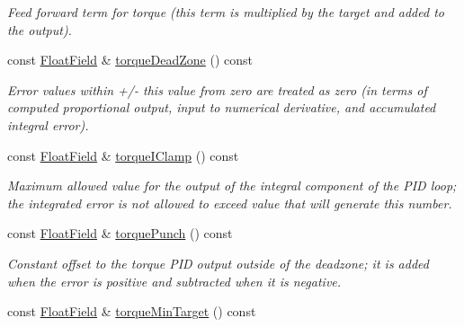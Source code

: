 \begin{DoxyCompactItemize}
\begin{DoxyCompactList}\small\item\em Feed forward term for torque (this term is multiplied by the target and added to the output). \end{DoxyCompactList}\item 
const \hyperlink{classhebi_1_1Info_1_1FloatField}{Float\+Field} \& \hyperlink{classhebi_1_1Info_1_1Settings_1_1Actuator_1_1TorqueGains_a2626b79437a08ccd5c1c5ac2aa8c3142}{torque\+Dead\+Zone} () const \hypertarget{classhebi_1_1Info_1_1Settings_1_1Actuator_1_1TorqueGains_a2626b79437a08ccd5c1c5ac2aa8c3142}{}\label{classhebi_1_1Info_1_1Settings_1_1Actuator_1_1TorqueGains_a2626b79437a08ccd5c1c5ac2aa8c3142}

\begin{DoxyCompactList}\small\item\em Error values within +/-\/ this value from zero are treated as zero (in terms of computed proportional output, input to numerical derivative, and accumulated integral error). \end{DoxyCompactList}\item 
const \hyperlink{classhebi_1_1Info_1_1FloatField}{Float\+Field} \& \hyperlink{classhebi_1_1Info_1_1Settings_1_1Actuator_1_1TorqueGains_ad7891144d29f8f64be2e34aa76c775b6}{torque\+I\+Clamp} () const \hypertarget{classhebi_1_1Info_1_1Settings_1_1Actuator_1_1TorqueGains_ad7891144d29f8f64be2e34aa76c775b6}{}\label{classhebi_1_1Info_1_1Settings_1_1Actuator_1_1TorqueGains_ad7891144d29f8f64be2e34aa76c775b6}

\begin{DoxyCompactList}\small\item\em Maximum allowed value for the output of the integral component of the P\+ID loop; the integrated error is not allowed to exceed value that will generate this number. \end{DoxyCompactList}\item 
const \hyperlink{classhebi_1_1Info_1_1FloatField}{Float\+Field} \& \hyperlink{classhebi_1_1Info_1_1Settings_1_1Actuator_1_1TorqueGains_a9fbb7aa71e799e48e4d2e1785309ef07}{torque\+Punch} () const \hypertarget{classhebi_1_1Info_1_1Settings_1_1Actuator_1_1TorqueGains_a9fbb7aa71e799e48e4d2e1785309ef07}{}\label{classhebi_1_1Info_1_1Settings_1_1Actuator_1_1TorqueGains_a9fbb7aa71e799e48e4d2e1785309ef07}

\begin{DoxyCompactList}\small\item\em Constant offset to the torque P\+ID output outside of the deadzone; it is added when the error is positive and subtracted when it is negative. \end{DoxyCompactList}\item 
const \hyperlink{classhebi_1_1Info_1_1FloatField}{Float\+Field} \& \hyperlink{classhebi_1_1Info_1_1Settings_1_1Actuator_1_1TorqueGains_a2b6f09420626f19f38e5ef9fc65788b6}{torque\+Min\+Target} () const \hypertarget{classhebi_1_1Info_1_1Settings_1_1Actuator_1_1TorqueGains_a2b6f09420626f19f38e5ef9fc65788b6}{}\label{classhebi_1_1Info_1_1Settings_1_1Actuator_1_1TorqueGains_a2b6f09420626f19f38e5ef9fc65788b6}


\end{DoxyCompactItemize}
